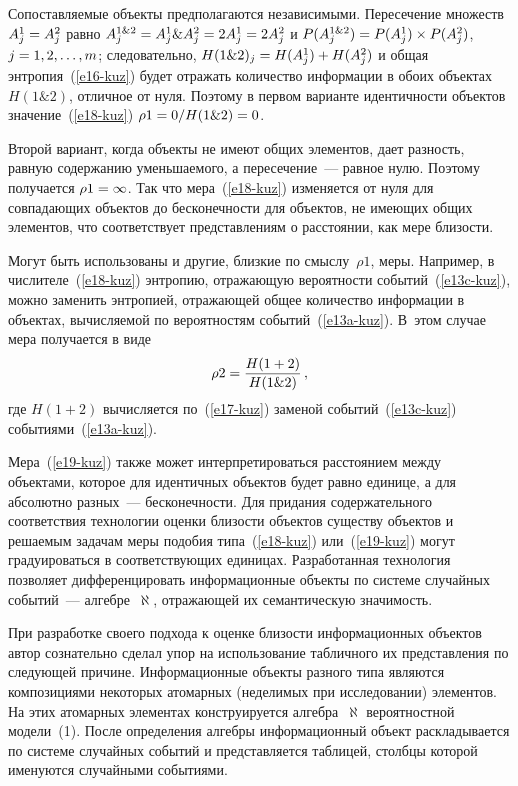 \begin{multicols}{2}
  Сопоставляемые объекты предполагаются независимыми. Пересечение
множеств $A_j^1\hm= A_j^2$ равно $A_j^{1\&2} \hm= A_j^1\&A_j^2\hm=
2A_j^1\hm= 2A_j^2$ и $P(A_j^{1\&2})\hm= P(A_j^1)\times P(A_j^2)$, $j\hm=1,
2, \ldots , m$; следовательно, $H(1\&2)_j \hm= H(A_j^1)\hm+ H(A_j^2)$ и общая
энтропия~(\ref{e16-kuz}) будет отражать количество информации в обоих
объектах $H(1\&2)$, отличное от нуля. Поэтому в первом варианте
идентичности объектов значение~(\ref{e18-kuz}) $\rho1\hm= 0 / H(1\&2) \hm=
0$.

  Второй вариант, когда объекты не имеют общих элементов, дает разность,
равную содержанию уменьшаемого, а пересечение~--- равное нулю. Поэтому
получается $\rho1\hm=\infty$. Так что мера~(\ref{e18-kuz}) изменяется от нуля
для совпадающих объектов до бес\-ко\-неч\-ности для объектов, не имеющих общих
элементов, что соответствует представлениям о расстоянии, как мере близости.

  Могут быть использованы и другие, близкие по смыслу~$\rho1$, меры.
Например, в числителе~(\ref{e18-kuz}) энтропию, отражающую вероятности
событий~(\ref{e13c-kuz}), можно заменить энтропией, отражающей общее
количество информации в объектах, вычисляемой по вероятностям
событий~(\ref{e13a-kuz}). В~этом случае мера получается в виде
  \begin{equation}
  \rho2 =\displaystyle\frac{\displaystyle H(1+2)\mathstrut}{\displaystyle H(1\&2)\mathstrut}\,,
  \label{e19-kuz}
  \end{equation}
где $H(1+2)$ вычисляется по~(\ref{e17-kuz}) заменой событий~(\ref{e13c-kuz})
событиями~(\ref{e13a-kuz}).

  Мера~(\ref{e19-kuz}) также может интерпретироваться расстоянием между
объектами, которое для идентичных объектов будет равно единице, а для
абсолютно разных~--- бесконечности. Для придания содержательного
соответствия технологии оценки близости объектов существу объектов и
решаемым задачам меры подобия типа~(\ref{e18-kuz}) или~(\ref{e19-kuz}) могут
градуироваться в соответствующих единицах. Разработанная технология
позволяет дифференцировать информационные объекты по системе случайных
событий~--- алгебре~$\aleph$, отражающей их семантическую значимость.

  При разработке своего подхода к оценке бли\-зости информационных
объектов автор сознательно сделал упор на использование табличного их\linebreak
представления по следующей причине. Информационные объекты разного типа
являются композициями некоторых атомарных (неделимых при исследова\-нии)
элементов. На этих атомарных элементах конструируется алгебра~$\aleph$
вероятностной модели~(1). После определения алгебры информационный
объект раскладывается по системе случайных событий и представляется
таблицей, столбцы которой именуются случайными событиями.


\end{multicols}
